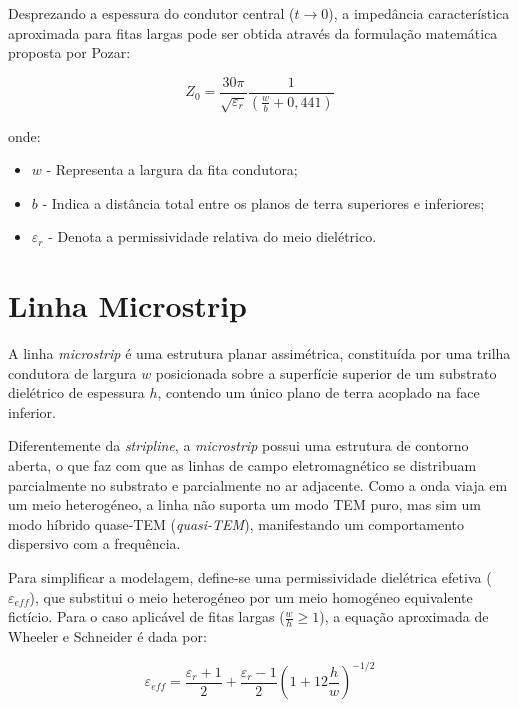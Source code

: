 \documentclass[12pt,a4paper]{report}
\begin{document}
Desprezando a espessura do condutor central ($t \to 0$), a impedância característica aproximada para fitas largas pode ser obtida através da formulação matemática proposta por Pozar:

\begin{equation}
\boxed{
Z_0 = \frac{30\pi}{\sqrt{\varepsilon_r}} \frac{1}{\left( \frac{w}{b} + 0,441 \right)}
}
\end{equation}

onde:

\begin{itemize}
    \item $w$ - Representa a largura da fita condutora;
    \item $b$ - Indica a distância total entre os planos de terra superiores e inferiores;
    \item $\varepsilon_r$ - Denota a permissividade relativa do meio dielétrico.
\end{itemize}

\newpage


\section{Linha Microstrip}

A linha \textit{microstrip} é uma estrutura planar assimétrica, constituída por uma trilha condutora de largura $w$ posicionada sobre a superfície superior de um substrato dielétrico de espessura $h$, contendo um único plano de terra acoplado na face inferior.

Diferentemente da \textit{stripline}, a \textit{microstrip} possui uma estrutura de contorno aberta, o que faz com que as linhas de campo eletromagnético se distribuam parcialmente no substrato e parcialmente no ar adjacente. Como a onda viaja em um meio heterogéneo, a linha não suporta um modo TEM puro, mas sim um modo híbrido quase-TEM (\textit{quasi-TEM}), manifestando um comportamento dispersivo com a frequência.

Para simplificar a modelagem, define-se uma permissividade dielétrica efetiva ($\varepsilon_{eff}$), que substitui o meio heterogéneo por um meio homogéneo equivalente fictício. Para o caso aplicável de fitas largas ($\frac{w}{h} \ge 1$), a equação aproximada de Wheeler e Schneider é dada por:

\begin{equation}
\boxed{
\varepsilon_{eff} = \frac{\varepsilon_r+1}{2} + \frac{\varepsilon_r-1}{2}\left(1+12\frac{h}{w}\right)^{-1/2}
}
\end{equation}
\end{document}
